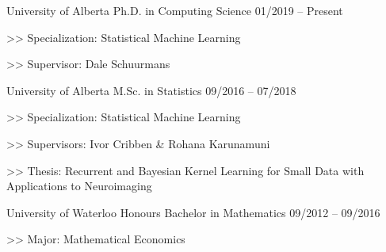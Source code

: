 \begin{cventries}
  \cventry
    {University of Alberta}
    {Ph.D. in Computing Science}
    {01/2019 -- Present}
    {
      \begin{cvitems}
        \item[>>] {Specialization: Statistical Machine Learning}
        \item[>>] {Supervisor: Dale Schuurmans}
      \end{cvitems}
    }

  \cventry
    {University of Alberta}
    {M.Sc. in Statistics}
    {09/2016 -- 07/2018}
    {
      \begin{cvitems}
        \item[>>] {Specialization: Statistical Machine Learning}
        \item[>>] {Supervisors: Ivor Cribben \& Rohana Karunamuni}
        \item[>>] {Thesis: Recurrent and Bayesian Kernel Learning for Small Data with Applications to Neuroimaging}
      \end{cvitems}
    }
  \cventry
    {University of Waterloo}
    {Honours Bachelor in Mathematics}
    {09/2012 -- 09/2016}
    {
      \begin{cvitems}
        \item[>>] Major: Mathematical Economics
      \end{cvitems}
    }
\end{cventries}

